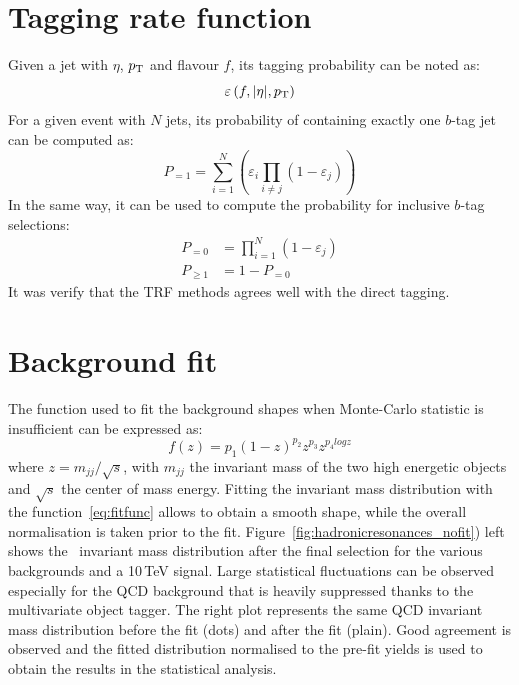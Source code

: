 \documentclass[a4paper,11pt]{article}
\begin{document}
\section{Tagging rate function}%
\label{sec:app:trf}
Given a jet with $\eta$, $p_{\text{T}}$ and flavour $f$, its tagging probability can be noted as:
\begin{equation*}
	\varepsilon \left(f,|\eta|,p_{\text{T}}\right)
\end{equation*}
\newline
For a given event with $N$ jets, its probability of containing exactly one $b$-tag jet can be computed as:
\begin{equation*}
	P_{=1} = \sum\limits_{i=1}^N \left( \varepsilon_{i} \prod\limits_{i \neq j} \left( 1 - \varepsilon_{j} \right) \right)
\end{equation*}
\newline
In the same way, it can be used to compute the probability for inclusive $b$-tag selections:
\begin{align*}
	P_{=0} &= \prod\limits_{i=1}^N \left( 1 - \varepsilon_{j} \right) \\
	P_{\geq 1} &= 1 - P_{=0}
\end{align*}
\newline
It was verify that the TRF methods agrees well with the direct tagging.


\section{Background fit}%
\label{sec:app:bgfit}
The function used to fit the background shapes when Monte-Carlo statistic is insufficient can be expressed as:
\begin{equation}
\label{eq:fitfunc}
f(z)=p_1(1-z)^{p_2}z^{p_3}z^{p_{4}logz}
\end{equation}
where $z=m_{jj}/\sqrt{s}$, with $m_{jj}$ the invariant mass of the two high energetic objects and $\sqrt{s}$ the center of mass energy. Fitting the invariant mass distribution with the function~\ref{eq:fitfunc} allows to obtain a smooth shape, while the overall normalisation is taken prior to the fit. Figure~\ref{fig:hadronicresonances_nofit}) left shows the \Zptt\ invariant mass distribution after the final selection for the various backgrounds and a 10\,TeV signal. Large statistical fluctuations can be observed especially for the QCD background that is heavily suppressed thanks to the multivariate object tagger. The right plot represents the same QCD invariant mass distribution before the fit (dots) and after the fit (plain). Good agreement is observed and the fitted distribution normalised to the pre-fit yields is used to obtain the results in the statistical analysis.
\end{document}
